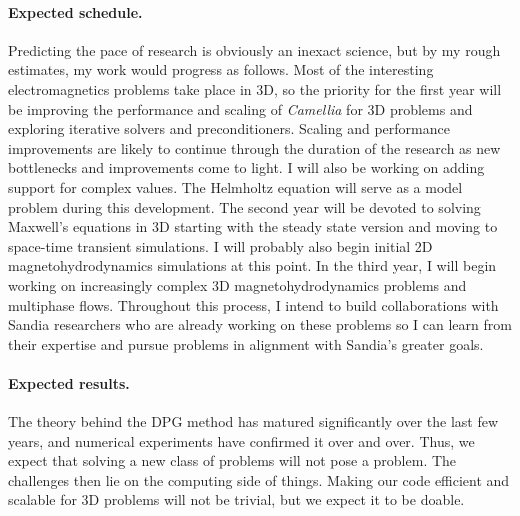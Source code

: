 \documentclass[letterpaper]{article}
\begin{document}
\paragraph{Expected schedule.}
Predicting the pace of research is obviously an inexact science, but by my rough estimates, my work would progress as follows.
Most of the interesting electromagnetics problems take place in 3D, so the priority for the first year will 
be improving the performance and scaling of \emph{Camellia} for 3D problems and exploring iterative solvers and preconditioners.
Scaling and performance improvements are likely to continue through the duration of the research as new bottlenecks and improvements come to light.
I will also be working on adding support for complex values. The Helmholtz equation will serve as a model problem during this development.
The second year will be devoted to solving Maxwell's equations in 3D starting with the steady state version and moving to space-time transient simulations.
I will probably also begin initial 2D magnetohydrodynamics simulations at this point.
In the third year, I will begin working on increasingly complex 3D magnetohydrodynamics problems and multiphase flows.
Throughout this process, I intend to build collaborations with Sandia researchers who are already working on these problems so I can 
learn from their expertise and pursue problems in alignment with Sandia's greater goals.

\paragraph{Expected results.}
The theory behind the DPG method has matured significantly over the last few years, and numerical experiments have confirmed it over and over.
Thus, we expect that solving a new class of problems will not pose a problem.
The challenges then lie on the computing side of things. 
Making our code efficient and scalable for 3D problems will not be trivial, but we expect it to be doable.


 

\end{document}
